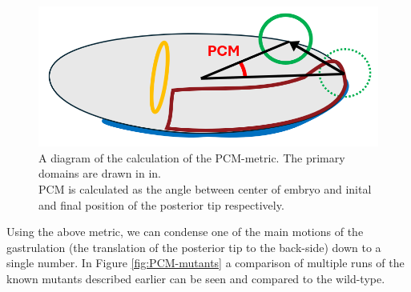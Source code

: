 \begin{figure}[H]
    \centering
    \includegraphics[width=0.75\linewidth]{chapters//Results//figures/PCM_diagram.png}
    \caption{A diagram of the calculation of the PCM-metric.
    The primary domains are drawn in in.\\
    PCM is calculated as the angle between center of embryo and inital and final position of the posterior tip respectively.}
    \label{fig:PCM_diagram}
\end{figure}

Using the above metric, we can condense one of the main motions of the gastrulation (the translation of the posterior tip to the back-side) down to a single number. In Figure \ref{fig:PCM-mutants} a comparison of multiple runs of the known mutants described earlier can be seen and compared to the wild-type.


